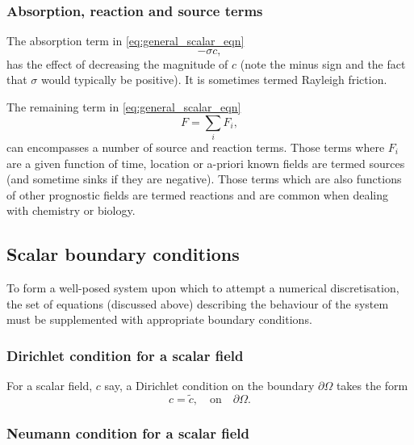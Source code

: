\subsubsection{Absorption, reaction and source terms}\label{sec:MP-AdvdifEqn-abs}

The absorption term in \eqref{eq:general_scalar_eqn}
\begin{equation}\label{eq:scalar_absorption}
-\sigma c,
\end{equation}
has the effect of decreasing the magnitude of $c$ (note the minus sign and the fact
that $\sigma$ would typically be positive). It is sometimes termed Rayleigh friction.

The remaining term in \eqref{eq:general_scalar_eqn}
\begin{equation}\label{eq:scalar_source}
F = \sum_i F_i,
\end{equation}
can encompasses a number of source and reaction terms. Those terms where $F_i$ are
a given function of time, location or a-priori known fields are termed sources (and sometime
sinks if they are negative). Those terms which are also functions of other prognostic fields
are termed reactions and are common when dealing with chemistry or biology.

\subsection{Scalar boundary conditions} \label{sec:BCs}


To form a well-posed system upon which to attempt a numerical discretisation, the
set of equations (discussed above) describing the behaviour of the
system must be supplemented with appropriate boundary conditions.


\subsubsection{Dirichlet condition for a scalar field}\label{sec:bc_scalar_dirichlet}
For a scalar field, $c$ say, a Dirichlet condition on the boundary
$\partial\Omega$ takes the form
\begin{equation*}
c=\tilde{c},\quad \textrm{on}\quad \partial\Omega.
\end{equation*}


\subsubsection{Neumann condition for a scalar field}\label{sec:bc_scalar_neumann}

